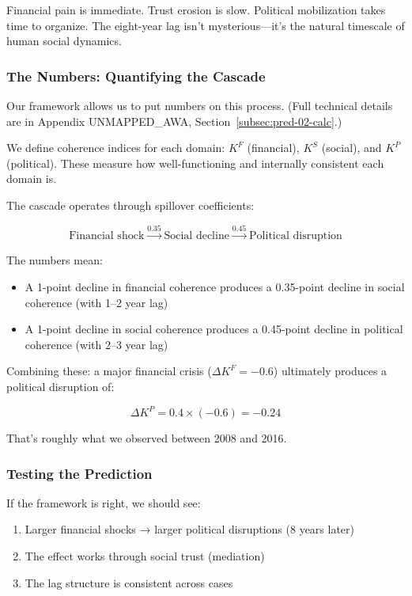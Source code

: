 Financial pain is immediate. Trust erosion is slow. Political mobilization 
takes time to organize. The eight-year lag isn't mysterious---it's the 
natural timescale of human social dynamics.

\subsubsection{The Numbers: Quantifying the Cascade}

Our framework allows us to put numbers on this process. (Full technical 
details are in Appendix UNMAPPED_AWA, Section~\ref{subsec:pred-02-calc}.)

We define coherence indices for each domain: $K^F$ (financial), 
$K^S$ (social), and $K^P$ (political). These measure how well-functioning 
and internally consistent each domain is.

The cascade operates through spillover coefficients:

\begin{equation}
\text{Financial shock} \xrightarrow{0.35} \text{Social decline} \xrightarrow{0.45} \text{Political disruption}
\end{equation}

The numbers mean:
\begin{itemize}
    \item A 1-point decline in financial coherence produces a 0.35-point 
    decline in social coherence (with 1--2 year lag)
    \item A 1-point decline in social coherence produces a 0.45-point 
    decline in political coherence (with 2--3 year lag)
\end{itemize}

Combining these: a major financial crisis ($\Delta K^F = -0.6$) ultimately 
produces a political disruption of:

\begin{equation}
\Delta K^P = 0.4 \times (-0.6) = -0.24
\end{equation}

That's roughly what we observed between 2008 and 2016.

\subsubsection{Testing the Prediction}

If the framework is right, we should see:

\begin{enumerate}
    \item Larger financial shocks → larger political disruptions (8 years later)
    \item The effect works through social trust (mediation)
    \item The lag structure is consistent across cases
\end{enumerate}

